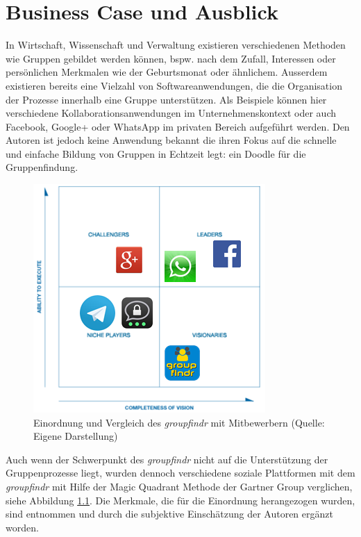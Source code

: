 \chapter{Business Case und Ausblick}
\label{business_case}

In Wirtschaft, Wissenschaft und Verwaltung existieren verschiedenen Methoden wie Gruppen gebildet werden können, bspw. nach dem Zufall, Interessen oder persönlichen Merkmalen wie der Geburtsmonat oder ähnlichem. Ausserdem existieren bereits eine Vielzahl von Softwareanwendungen, die die Organisation der Prozesse innerhalb eine Gruppe unterstützen. Als Beispiele können hier verschiedene Kollaborationsanwendungen im Unternehmenskontext oder auch Facebook, Google+ oder WhatsApp im privaten Bereich aufgeführt werden. Den Autoren ist jedoch keine Anwendung bekannt die ihren Fokus auf die schnelle und einfache Bildung von Gruppen in Echtzeit legt: ein Doodle für die Gruppenfindung. 

\begin{figure}[h]
\centering
\includegraphics{graphiken/magic_quadrant.png}%
\caption{Einordnung und Vergleich des \emph{groupfindr} mit Mitbewerbern (Quelle: Eigene Darstellung)}%
\label{magic_quadrant}%
\end{figure}

Auch wenn der Schwerpunkt des \emph{groupfindr} nicht auf die Unterstützung der Gruppenprozesse liegt, wurden dennoch verschiedene soziale Plattformen mit dem \emph{groupfindr} mit Hilfe der Magic Quadrant Methode der Gartner Group \citet{magic_quadrant} verglichen, siehe Abbildung \ref{magic_quadrant}.  Die Merkmale, die für die Einordnung herangezogen wurden, sind \citet{gruppen-bildung} entnommen und durch die subjektive Einschätzung der Autoren ergänzt worden.

